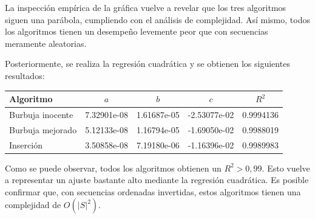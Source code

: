 \documentclass[letter]{article}
\begin{document}
\newpage

La inspección empírica de la gráfica vuelve a revelar que los tres algoritmos siguen una parábola, cumpliendo con el análisis de complejidad. Así mismo, todos los algoritmos tienen un desempeño levemente peor que con secuencias meramente aleatorias. \par

Posteriormente, se realiza la regresión cuadrática y se obtienen los siguientes resultados: \par

\begin{table}[!ht]
\begin{tabular}{|l|r|r|r|r|}
\hline
Algoritmo        & \multicolumn{1}{c|}{$a$} & \multicolumn{1}{c|}{$b$} & \multicolumn{1}{c|}{$c$} & \multicolumn{1}{c|}{$R^2$} \\ \hline
Burbuja inocente & 7.32901e-08            & 1.61687e-05            & -2.53077e-02            & 0.9994136              \\ \hline
Burbuja mejorado & 5.12133e-08            & 1.16794e-05            & -1.69050e-02            & 0.9988019              \\ \hline
Inserción        & 3.50858e-08            & 7.19180e-06            & -1.16396e-02           & 0.9989983              \\ \hline
\end{tabular}
\end{table}

Como se puede observar, todos los algoritmos obtienen un $R^2 > 0,99$. Esto vuelve a representar un ajuste bastante alto mediante la regresión cuadrática. Es posible confirmar que, con secuencias ordenadas invertidas, estos algoritmos tienen una complejidad de $O(|S|^2)$.
\end{document}
